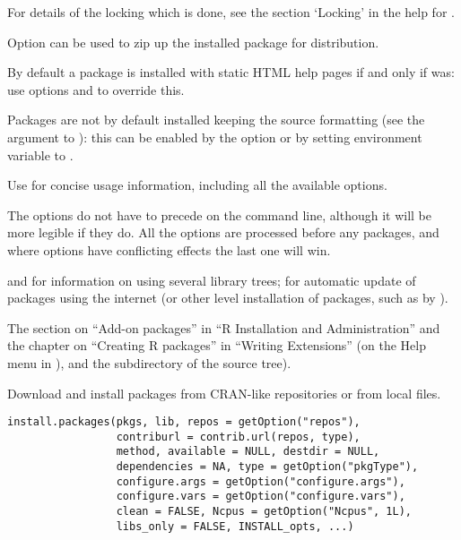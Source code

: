 \begin{Details}
For details of the locking which is done, see the section
`Locking' in the help for .


Option  can be used to zip up the installed package
for distribution.

By default a package is installed with static HTML help pages if and
only if \R{} was: use options  and  to
override this.

Packages are not by default installed keeping the source formatting
(see the  argument to ): this
can be enabled by the option  or by setting
environment variable  to .

Use  for concise usage information,
including all the available options.
\end{Details}
%
\begin{Note}\relax
The options do not have to precede  on the command line,
although it will be more legible if they do.  All the options are
processed before any packages, and where options have conflicting
effects the last one will win.
\end{Note}
%
\begin{SeeAlso}\relax
{} and  for information on
using several library trees;
 for automatic update of packages using
the internet (or other \R{} level installation of packages, such as by
).

The section on ``Add-on packages'' in ``R Installation and
Administration'' and the chapter on ``Creating R packages'' in
``Writing \R{} Extensions''
(on the Help menu in ),
 and the  subdirectory of the
\R{} source tree).
\end{SeeAlso}
%
\begin{Description}\relax
Download and install packages from CRAN-like repositories or from
local files.
\end{Description}
%
\begin{Usage}
\begin{verbatim}
install.packages(pkgs, lib, repos = getOption("repos"),
                 contriburl = contrib.url(repos, type),
                 method, available = NULL, destdir = NULL,
                 dependencies = NA, type = getOption("pkgType"),
                 configure.args = getOption("configure.args"),
                 configure.vars = getOption("configure.vars"),
                 clean = FALSE, Ncpus = getOption("Ncpus", 1L),
                 libs_only = FALSE, INSTALL_opts, ...)
\end{verbatim}
\end{Usage}
